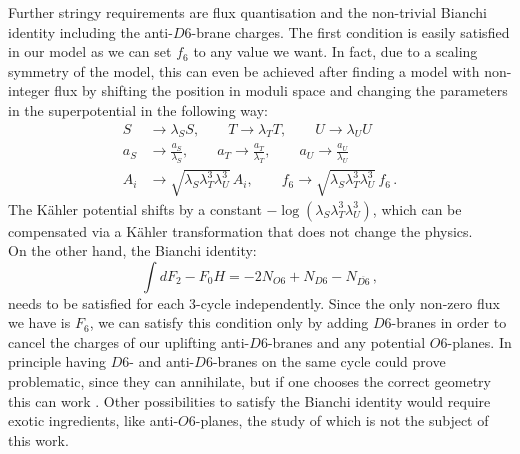 \documentclass[12pt]{report}
\newcommand{\be}{\begin{equation}}
\newcommand{\ee}{\end{equation}}
\newcommand{\bea}{\begin{equation}\begin{aligned}}
\newcommand{\eea}{\end{aligned}\end{equation}}
\begin{document}
Further stringy requirements are flux quantisation and the non-trivial Bianchi identity including the anti-$D6$-brane charges. The first condition is easily satisfied in our model as we can set $f_6$ to any value we want. In fact, due to a scaling symmetry of the model, this can even be achieved after finding a model with non-integer flux by shifting the position in moduli space and  changing the parameters in the superpotential in the following way:
\bea 
S &\to \lambda_S S, \qquad T \to \lambda_T T, \qquad U\to \lambda_U U\\
a_S &\to \frac{a_S }{\lambda_S},\qquad a_T \to \frac{a_T }{\lambda_T},\qquad a_U \to \frac{a_U }{\lambda_U}\\
A_i &\to \sqrt{\lambda_S \lambda_T^3 \lambda_U^3}\, A_i,\qquad f_6 \to \sqrt{\lambda_S \lambda_T^3 \lambda_U^3}\, f_6\,.
\eea
The Kähler potential shifts by a constant $-\log (\lambda_S \lambda_T^3 \lambda_U^3)$, which can be compensated  via a Kähler transformation that does not change the physics.\\
On the other hand, the Bianchi identity:
\be 
\int dF_2 - F_0 H = -2 N_{O6} + N_{D6} - N_{\overline{D6}}\,,
\ee
needs to be satisfied for each 3-cycle independently. Since the only non-zero flux we have is $F_6$, we can satisfy this condition only by adding $D6$-branes in order to cancel the charges of our uplifting anti-$D6$-branes and any potential $O6$-planes. In principle having $D6$- and anti-$D6$-branes on the same cycle could prove problematic, since they can annihilate, but if one chooses the correct geometry this can work \cite{Retolaza:2015sta}. Other possibilities to satisfy the Bianchi identity would require exotic ingredients, like anti-$O6$-planes, the study of which is not the subject of this work.
\end{document}
